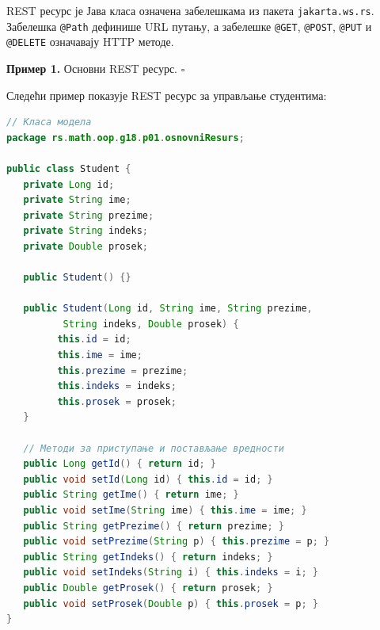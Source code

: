 REST ресурс је Јава класа означена забелешкама из пакета \texttt{jakarta.ws.rs}. Забелешка \texttt{@Path} дефинише URL путању, а забелешке \texttt{@GET}, \texttt{@POST}, \texttt{@PUT} и \texttt{@DELETE} означавају HTTP методе.


\bigskip

\noindent \textbf{Пример 1.} Основни REST ресурс. $\square$

\medskip

Следећи пример показује REST ресурс за управљање студентима:


\begin{lstlisting}[language=Java]
// Класа модела
package rs.math.oop.g18.p01.osnovniResurs;
 
public class Student {
   private Long id;
   private String ime;
   private String prezime;
   private String indeks;
   private Double prosek;
 
   public Student() {}
 
   public Student(Long id, String ime, String prezime,
          String indeks, Double prosek) {
         this.id = id;
         this.ime = ime;
         this.prezime = prezime;
         this.indeks = indeks;
         this.prosek = prosek;
   }
 
   // Методи за приступање и постављање вредности
   public Long getId() { return id; }
   public void setId(Long id) { this.id = id; }
   public String getIme() { return ime; }
   public void setIme(String ime) { this.ime = ime; }
   public String getPrezime() { return prezime; }
   public void setPrezime(String p) { this.prezime = p; }
   public String getIndeks() { return indeks; }
   public void setIndeks(String i) { this.indeks = i; }
   public Double getProsek() { return prosek; }
   public void setProsek(Double p) { this.prosek = p; }
}
\end{lstlisting}


